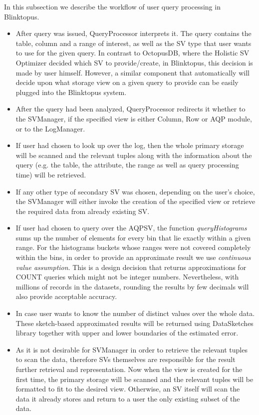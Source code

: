 \documentclass[10pt, conference, compsocconf]{IEEEtran}
\begin{document}
In this subsection we describe the workflow of user query processing in Blinktopus.
\begin{itemize}
\item{After query was issued, QueryProcessor interprets it. The query contains the table, column and a range of interest, as well as the SV type that user wants to use for the given query. In contrast to OctopusDB, where the Holistic SV Optimizer decided which SV to provide/create, in Blinktopus, this decision is made by user himself. However, a similar component that automatically will decide upon what storage view on a given query to provide can be easily plugged into the Blinktopus system.}
\item{After the query had been analyzed, QueryProcessor redirects it whether to the SVManager, if the specified view is either Column, Row or AQP module, or to the LogManager.}
\item{If user had chosen to look up over the log, then the whole primary storage will be scanned and the relevant tuples along with the information about the query (e.g. the table, the attribute, the range as well as query processing time) will be retrieved.}
\item{If any other type of secondary SV was chosen, depending on the user's choice, the SVManager will either invoke the creation of the specified view or retrieve the required data from already existing SV.}
\item{If user had chosen to query over the AQPSV, the function \textit{queryHistograms} sums up the number of elements for every bin that lie exactly within a given range. For the histograms buckets whose ranges were not covered completely within the bins, in order to provide an approximate result we use \textit{continuous value assumption}. This is a design decision that returns approximations for COUNT queries which might not be integer numbers. Nevertheless, with millions of records in the datasets, rounding the results by few decimals will also provide acceptable accuracy.}
\item{In case user wants to know the number of distinct values over the whole data. These sketch-based approximated results will be returned using DataSketches library together with upper and lower boundaries of the estimated error.}
\item{As it is not desirable for SVManager in order to retrieve the relevant tuples to scan the data, therefore SVs themselves are responsible for the result further retrieval and representation. Now when the view is created for the first time, the primary storage will be scanned and the relevant tuples will be formatted to fit to the desired view. Otherwise, an SV itself will scan the data it already stores and return to a user the only existing subset of the data.}
\end{itemize}
\end{document}

